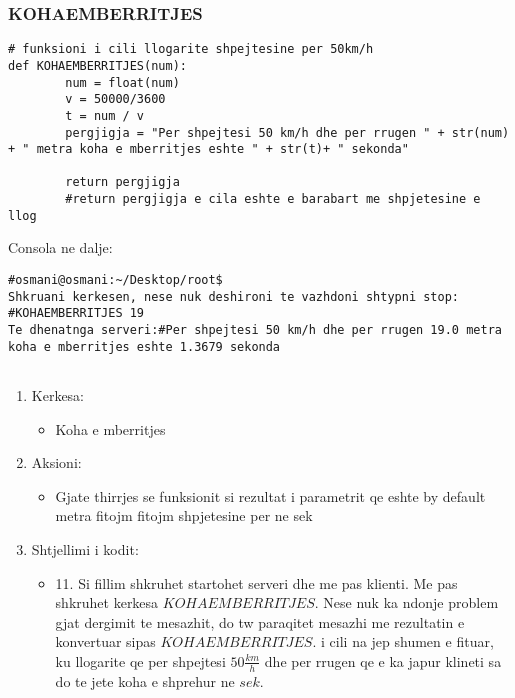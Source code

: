 \documentclass[]{article}
\begin{document}
\subsubsection{KOHAEMBERRITJES}
\begin{lstlisting}
# funksioni i cili llogarite shpejtesine per 50km/h
def KOHAEMBERRITJES(num):
        num = float(num)
        v = 50000/3600
        t = num / v
        pergjigja = "Per shpejtesi 50 km/h dhe per rrugen " + str(num) + " metra koha e mberritjes eshte " + str(t)+ " sekonda"
        
        return pergjigja
        #return pergjigja e cila eshte e barabart me shpjetesine e llog

\end{lstlisting}
\vspace{1cm}
\noindent Consola ne dalje:
\begin{lstlisting}
#osmani@osmani:~/Desktop/root$
Shkruani kerkesen, nese nuk deshironi te vazhdoni shtypni stop: #KOHAEMBERRITJES 19
Te dhenatnga serveri:#Per shpejtesi 50 km/h dhe per rrugen 19.0 metra koha e mberritjes eshte 1.3679 sekonda


\end{lstlisting}
\begin{enumerate}
\item Kerkesa:

\begin{itemize}
\item Koha e mberritjes
\end{itemize}
\item Aksioni:

\begin{itemize}
\item Gjate thirrjes  se funksionit si rezultat i parametrit qe eshte by default metra fitojm fitojm shpjetesine per ne sek
\end{itemize}
\item Shtjellimi i kodit:
\begin{itemize}
\item 11.
Si fillim shkruhet startohet serveri dhe me pas klienti. Me pas
shkruhet kerkesa $ KOHAEMBERRITJES$.
Nese nuk ka ndonje problem gjat dergimit te mesazhit, do tw paraqitet mesazhi me rezultatin e konvertuar
sipas $KOHAEMBERRITJES.$ i cili na jep shumen e fituar, ku llogarite qe per shpejtesi $50\frac{km}{h}$ dhe per rrugen qe e ka japur klineti sa do te jete koha e shprehur ne $sek$.
\end{itemize}
\end{enumerate}
\newpage
\end{document}
